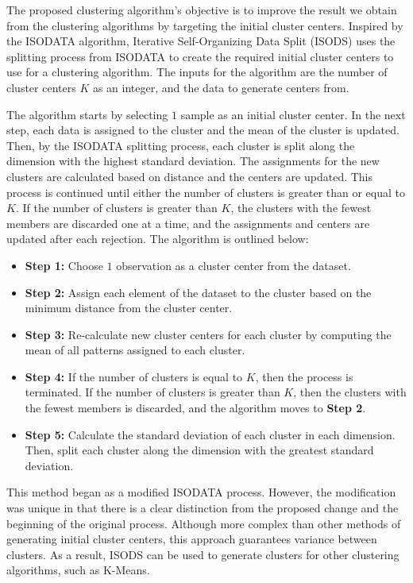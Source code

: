 \documentclass[a4paper,10pt]{article}
\begin{document}
The proposed clustering algorithm's objective is to improve the result we obtain
from the clustering algorithms by targeting the initial cluster centers.
Inspired by the ISODATA algorithm, Iterative Self-Organizing Data Split (ISODS)
uses the splitting process from ISODATA to create the required initial cluster
centers to use for a clustering algorithm. The inputs for the algorithm are the
number of cluster centers $K$ as an integer, and the data to generate centers
from. 

The algorithm starts by selecting $1$ sample as an initial cluster center. In
the next step, each data is assigned to the cluster and the mean of the cluster
is updated. Then, by the ISODATA splitting process, each cluster is split along
the dimension with the highest standard deviation. The assignments for the new
clusters are calculated based on distance and the centers are updated. This
process is continued until either the number of clusters is greater than or
equal to $K$. If the number of clusters is greater than $K$, the clusters with
the fewest members are discarded one at a time, and the assignments and centers
are updated after each rejection. The algorithm is outlined below:

\begin{itemize}
      \item \textbf{Step 1:} Choose $1$ observation as a cluster center from the
            dataset.
      \item \textbf{Step 2:} Assign each element of the dataset to the cluster
            based on the minimum distance from the cluster center.
      \item \textbf{Step 3:} Re-calculate new cluster centers for each cluster
            by computing the mean of all patterns assigned to each cluster.
      \item \textbf{Step 4:} If the number of clusters is equal to $K$, then the
            process is terminated. If the number of clusters is greater than
            $K$, then the clusters with the fewest members is discarded, and the
            algorithm moves to \textbf{Step 2}.
      \item \textbf{Step 5:} Calculate the standard deviation of each cluster in
            each dimension. Then, split each cluster along the dimension with
            the greatest standard deviation.
\end{itemize}

This method began as a modified ISODATA process. However, the modification was
unique in that there is a clear distinction from the proposed change and the
beginning of the original process. Although more complex than other methods of
generating initial cluster centers, this approach guarantees variance between
clusters. As a result, ISODS can be used to generate clusters for other
clustering algorithms, such as K-Means.
\end{document}
